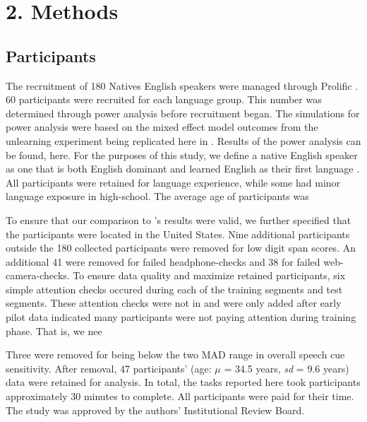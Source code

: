 \section{2. Methods}

\subsection{Participants}
The recruitment of 180 Natives English speakers were managed through Prolific \citep{Palan_2018}. 60 participants were recruited for each language group. This number was determined through power analysis before recruitment began. The simulations for power analysis were based on the mixed effect model outcomes from the unlearning experiment being replicated here in \cite{nixon2020mice}. Results of the power analysis can be found, here.   For the purposes of this study, we define a native English speaker as one that is both English dominant and learned English as their first language \citep{Brown_Tusmagambet_Rahming_Tu_DeSalvo_Wiener_2023}. All participants were retained for language experience, while some had minor language exposure in high-school. The average age of participants was 

To ensure that our comparison to \cite{nixon2020mice}'s results were valid, we further specified that the participants were located in the United States. Nine additional participants outside the 180 collected participants were removed for low digit span scores. An additional 41 were removed for failed headphone-checks \citep{milne_2021} and 38 for failed web-camera-checks. To ensure data quality and maximize retained participants, six simple attention checks occured during each of the training segments and test segments. These attention checks were not in \cite{nixon2020mice} and were only added after early pilot data indicated many participants were not paying attention during training phase. That is, we nee

Three were removed for being below the two MAD \citep{Leys_2013} range in overall speech cue sensitivity. After removal, 47 participants' (age: $\mu$ = 34.5 years, \textit{sd} = 9.6 years) data were retained for analysis. In total, the tasks reported here took participants approximately 30 minutes to complete. All participants were paid for their time. The study was approved by the authors' Institutional Review Board.
